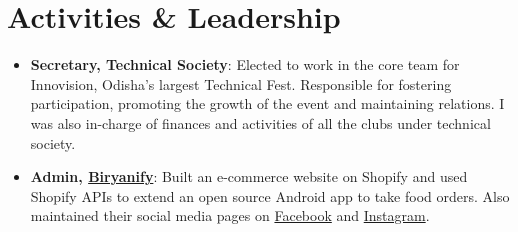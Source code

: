 \documentclass[a4paper,10pt]{extarticle} %
\begin{document}
\vspace{-0.6cm}
\section{\textcolor{primary}{Activities \& Leadership}}

\begin{itemize}[leftmargin=0.55cm, rightmargin=0.2cm, label={\Large\textbullet}]
\item \textbf{Secretary, {Technical Society}}: 
Elected to work in the core team for Innovision, Odisha's largest Technical Fest. Responsible for fostering participation, promoting the growth of the event and maintaining relations. I was also in-charge of finances and activities of all the clubs under technical society.
\item \textbf{Admin, \href{https://www.biryanify.com}{Biryanify}}: Built an e-commerce website on Shopify and used Shopify APIs to extend an open source Android app to take food orders. Also maintained their social media pages on \href{https://www.facebook.com/biryanify}{Facebook} and \href{https://www.instagram.com/biryanify/}{Instagram}.

\end{itemize}





\vspace{-0.15cm}
\end{document}
